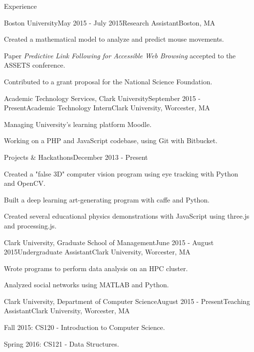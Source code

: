 \documentclass{resume} %
\begin{document}
\begin{rSection}{Experience}


\begin{rSubsection}{Boston University}{May 2015 - July 2015}{Research Assistant}{Boston, MA}
\item Created a mathematical model to analyze and predict mouse movements.
\item Paper \emph{Predictive Link Following for Accessible Web Browsing} accepted to the ASSETS conference.
\item Contributed to a grant proposal for the National Science Foundation.
\end{rSubsection}


\begin{rSubsection}{Academic Technology Services, Clark University}{September 2015 - Present}{Academic Technology Intern}{Clark University, Worcester, MA}
\item Managing University's learning platform Moodle.
\item Working on a PHP and JavaScript codebase, using Git with Bitbucket.
\end{rSubsection}


\begin{rSubsection}{Projects \& Hackathons}{December 2013 - Present}{}{}
\item Created a "false 3D" computer vision program using eye tracking with Python and OpenCV.
\item Built a deep learning art-generating program with caffe and Python.
\item Created several educational physics demonstrations with JavaScript using three.js and processing.js.
\end{rSubsection}


\begin{rSubsection}{Clark University, Graduate School of Management}{June 2015 - August 2015}{Undergraduate Assistant}{Clark University, Worcester, MA}
\item Wrote programs to perform data analysis on an HPC cluster.
\item Analyzed social networks using MATLAB and Python.
\end{rSubsection}


\begin{rSubsection}{Clark University, Department of Computer Science}{August 2015 - Present}{Teaching Assistant}{Clark University, Worcester, MA}
\item Fall 2015: CS120 - Introduction to Computer Science.
\item Spring 2016: CS121 - Data Structures.
\end{rSubsection}

\end{rSection}
\end{document}
